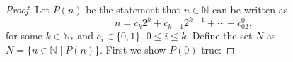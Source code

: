 \documentclass[11pt,twoside, reqno, align]{amsart}
\theoremstyle{remark}
\def\N{\mathbb N}
\begin{document}
\begin{proof}



Let $P(n)$ be the statement that $n \in \N$ can be written as
$$
n=c_k2^k+c_{k-1}2^{k-1}+\cdots+c_02^0,
$$
for some $k \in \N_*$ and $c_i \in \{0,1\}$, $0 \leq i \leq k$. Define the set $N$ as $N = \{ n \in \N \mid P(n)\}$. First we show $P(0)$ true:

\end{proof}
\end{document}
